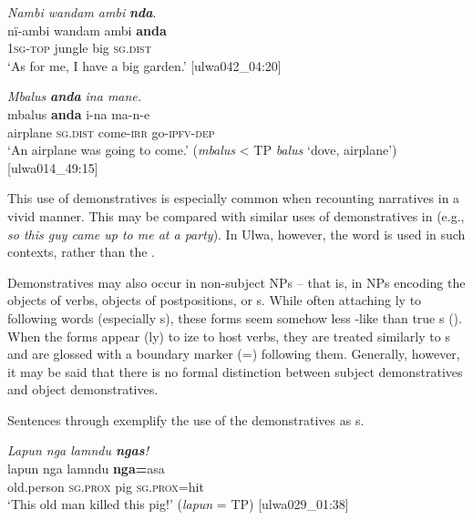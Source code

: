 \ea%
    \label{ex:det:130}
          \textit{Nambi wandam ambi} \textbf{\textit{nda}}.\\
\gll nï-ambi  wandam  ambi  \textbf{anda}\\
    1\textsc{sg-top}  jungle    big    \textsc{sg.dist}\\
\glt `As for me, I have a big garden.’ [ulwa042\_04:20]
\z

\ea%
    \label{ex:det:131}
          \textit{Mbalus} \textbf{\textit{anda}} \textit{ina mane.}\\
\gll    mbalus    \textbf{anda}    i-na    ma-n-e\\
    airplane  \textsc{sg.dist}  come-\textsc{irr}  go-\textsc{ipfv-dep}\\
\glt `An airplane was going to come.’ (\textit{mbalus} < TP \textit{balus} ‘dove, airplane’) [ulwa014\_49:15]
\z



This use of demonstratives is especially common when recounting narratives in a vivid manner. This may be compared with similar uses of demonstratives in  (e.g., \textit{so this guy came up to me at a party}). In Ulwa, however, the   word is used in such contexts, rather than the .

  Demonstratives may also occur in non-subject NPs -- that is, in NPs encoding the objects of verbs,  objects of postpositions, or  s. While often attaching ly to following words (especially s), these  forms seem somehow less -like than true s (). When the  forms appear (ly) to ize to host verbs, they are treated similarly to s and are glossed with a  boundary marker (=) following them. Generally, however, it may be said that there is no formal distinction between subject demonstratives and object demonstratives.

  Sentences  through  exemplify the use of the demonstratives as s.

\ea%
    \label{ex:det:132}
          \textit{Lapun nga lamndu \textbf{ngas}!}\\
\gll    lapun    nga      lamndu  \textbf{nga=}asa\\
    old.person  \textsc{sg.prox}  pig      \textsc{sg.prox}=hit\\
\glt `This old man killed this pig!’ (\textit{lapun} = TP) [ulwa029\_01:38]
\z

